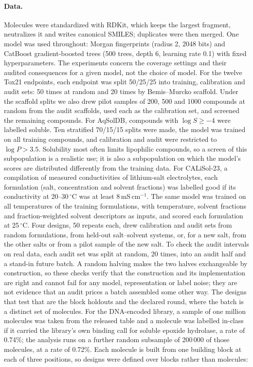 \documentclass[10pt]{article}
\begin{document}
\paragraph{Data.} Molecules were standardized with RDKit\citep{RDKit}, which keeps the largest fragment, neutralizes it and writes canonical SMILES; duplicates were then merged. One model was used throughout: Morgan fingerprints\citep{Rogers2010Morgan} (radius 2, 2048 bits) and CatBoost gradient-boosted trees\citep{Prokhorenkova2018CatBoost} (500 trees, depth 6, learning rate 0.1) with fixed hyperparameters. The experiments concern the coverage settings and their audited consequences for a given model, not the choice of model. For the twelve Tox21 endpoints,\citep{Huang2016Tox21,Mayr2016DeepTox} each endpoint was split 50/25/25 into training, calibration and audit sets: 50 times at random and 20 times by Bemis--Murcko scaffold.\citep{Bemis1996Murcko} Under the scaffold splits we also drew pilot samples of 200, 500 and 1000 compounds at random from the audit scaffolds, used each as the calibration set, and screened the remaining compounds. For AqSolDB,\citep{Sorkun2019AqSolDB} compounds with $\log S\ge-4$ were labelled soluble. Ten stratified 70/15/15 splits were made, the model was trained on all training compounds, and calibration and audit were restricted to $\log P>3.5$. Solubility most often limits lipophilic compounds, so a screen of this subpopulation is a realistic use; it is also a subpopulation on which the model's scores are distributed differently from the training data. For CALiSol-23,\citep{deBlasio2024CALiSol} a compilation of measured conductivities of lithium-salt electrolytes, each formulation (salt, concentration and solvent fractions) was labelled good if its conductivity at 20--30\,$^\circ$C was at least 8\,mS\,cm$^{-1}$. The same model was trained on all temperatures of the training formulations, with temperature, solvent fractions and fraction-weighted solvent descriptors as inputs, and scored each formulation at 25\,$^\circ$C. Four designs, 50 repeats each, drew calibration and audit sets from random formulations, from held-out salt--solvent systems, or, for a new salt, from the other salts or from a pilot sample of the new salt. To check the audit intervals on real data, each audit set was split at random, 20 times, into an audit half and a stand-in future batch. A random halving makes the two halves exchangeable by construction, so these checks verify that the construction and its implementation are right and cannot fail for any model, representation or label noise; they are not evidence that an audit prices a batch assembled some other way. The designs that test that are the block holdouts and the declared round, where the batch is a distinct set of molecules. For the DNA-encoded library,\citep{Quigley2024BELKA} a sample of one million molecules was taken from the released table and a molecule was labelled in-class if it carried the library's own binding call for soluble epoxide hydrolase, a rate of 0.74\%; the analysis runs on a further random subsample of 200\,000 of those molecules, at a rate of 0.72\%. Each molecule is built from one building block at each of three positions, so designs were defined over blocks rather than molecules: 
\end{document}
